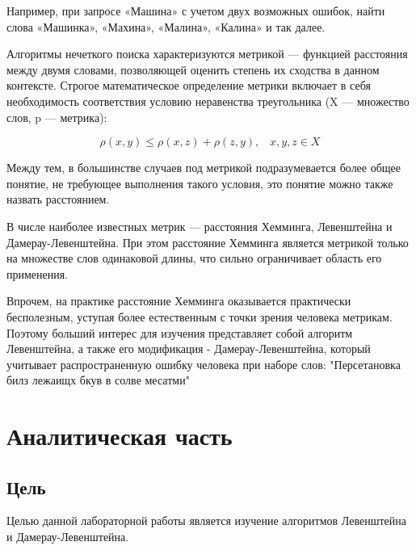 \documentclass[12pt]{report}
\begin{document}
    Например, при запросе «Машина» с учетом двух возможных ошибок, найти слова «Машинка», «Махина», «Малина», «Калина» и так далее.
    \vspace{0.5cm}
    
    Алгоритмы нечеткого поиска характеризуются метрикой — функцией расстояния между двумя словами, позволяющей оценить степень их сходства в данном контексте. Строгое математическое определение метрики включает в себя необходимость соответствия условию неравенства треугольника (X — множество слов, p — метрика):
    \vspace{0.5cm}
    
    \begin{equation} \label{eq0}
    \rho (x, y) \leqslant \rho (x, z) + \rho (z, y), \;\;\; x, y, z \in X
    \end{equation}
    \vspace{0.5cm}
    
    Между тем, в большинстве случаев под метрикой подразумевается более общее понятие, не требующее выполнения такого условия, это понятие можно также назвать расстоянием.
    \vspace{0.5cm}
    
    В числе наиболее известных метрик — расстояния Хемминга, Левенштейна и Дамерау-Левенштейна. При этом расстояние Хемминга является метрикой только на множестве слов одинаковой длины, что сильно ограничивает область его применения.
    \vspace{0.5cm}
    
    Впрочем, на практике расстояние Хемминга оказывается практически бесполезным, уступая более естественным с точки зрения человека метрикам. Поэтому больший интерес для изучения представляет собой алгоритм Левенштейна, а также его модификация - Дамерау-Левенштейна, который учитывает распространенную ошибку человека при наборе слов: "Персетановка билз лежаищх бкув в солве месатми"
    
   
    
    
    \chapter{Аналитическая часть}
    
    
    \section{Цель} 
    Целью данной лабораторной работы является изучение алгоритмов Левенштейна и Дамерау-Левенштейна.
    
\end{document}

